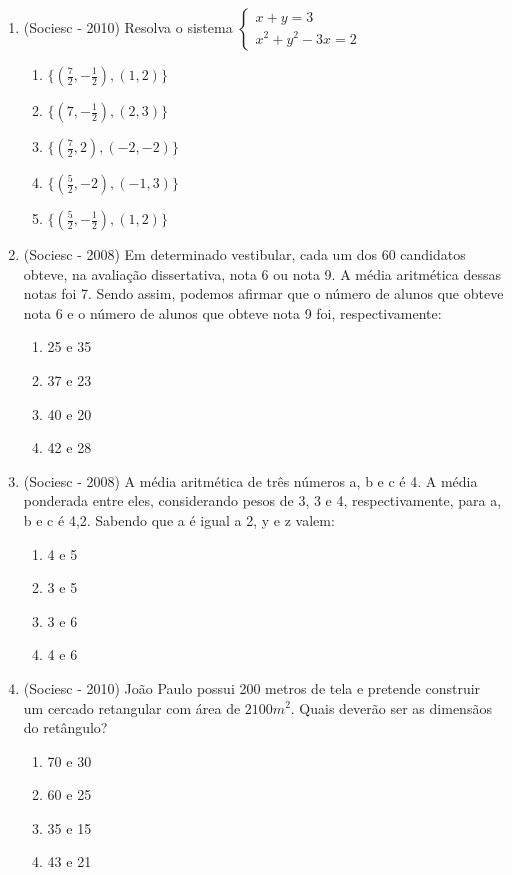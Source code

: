 \begin{enumerate}
 \item (Sociesc - 2010) Resolva o sistema
  $\begin{cases}
    x+y= 3 \\
    x^2+ y^2 -3x=2
   \end{cases}$
  \begin{enumerate}
  \item $\{(\frac{7}{2}, -\frac{1}{2}), (1,2)\}$
  \item $\{(7, -\frac{1}{2}), (2,3)\}$
  \item $\{(\frac{7}{2}, 2), (-2,-2)\}$
  \item $\{(\frac{5}{2}, -2), (-1,3)\}$
  \item $\{(\frac{5}{2}, -\frac{1}{2}), (1,2)\}$
 \end{enumerate}

 \item (Sociesc - 2008) Em determinado vestibular, cada um dos 60 candidatos obteve, na avaliação dissertativa, nota 6 ou nota 9. A média aritmética dessas notas foi 7. Sendo assim, podemos afirmar que o número de alunos que obteve nota 6 e o número de alunos que obteve nota 9 foi, respectivamente:
  \begin{enumerate}
  \item 25 e 35
  \item 37 e 23
  \item 40 e 20
  \item 42 e 28
 \end{enumerate}

 \item (Sociesc - 2008) A média aritmética de três números a, b e c é 4. A média ponderada entre eles, considerando pesos de 3, 3 e 4, respectivamente, para a, b e c é 4,2. Sabendo que a é igual a 2, y e z valem:
  \begin{enumerate}
  \item 4 e 5
  \item 3 e 5
  \item 3 e 6
  \item 4 e 6
 \end{enumerate}

 \item (Sociesc - 2010) João Paulo possui 200 metros de tela e pretende construir um cercado retangular com área de $2100 m^2$. Quais deverão ser as dimensãos do retângulo?
  \begin{enumerate}
  \item 70 e 30
  \item 60 e 25
  \item 35 e 15
  \item 43 e 21
 \end{enumerate}


\end{enumerate}
